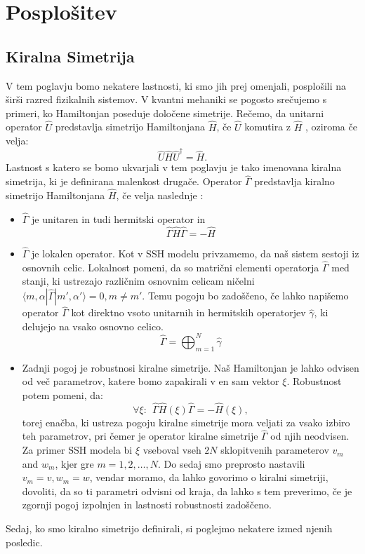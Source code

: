 \section{Posplošitev}
\subsection{Kiralna Simetrija}
V tem poglavju bomo nekatere lastnosti, ki smo jih prej omenjali, posplošili na širši razred fizikalnih sistemov.
V kvantni mehaniki se pogosto srečujemo s primeri, ko Hamiltonjan poseduje določene simetrije. Rečemo, da unitarni operator $\hat{U}$ predstavlja simetrijo Hamiltonjana $\hat{H}$, če $\hat{U}$ komutira z $\hat{H}$ \cite{symmetry}, oziroma če velja:
\begin{equation}
\hat{U} \hat{H} \hat{U}^\dagger = \hat{H}.
\end{equation}
Lastnost s katero se bomo ukvarjali v tem poglavju je tako imenovana kiralna simetrija, ki je definirana malenkost drugače. Operator $\hat{\Gamma}$ predstavlja kiralno simetrijo Hamiltonjana $\hat{H}$, če velja naslednje \cite{madzar}:
\begin{itemize}
 \item $\hat{\Gamma}$ je unitaren in tudi hermitski operator in
\begin{equation}
\hat{\Gamma} \hat{H} \hat{\Gamma} = - \hat{H}
\end{equation}
\item $\hat{\Gamma}$ je lokalen operator. Kot v SSH modelu privzamemo, da naš sistem sestoji iz osnovnih celic. Lokalnost pomeni, da so matrični elementi operatorja $\hat{\Gamma}$ med stanji, ki ustrezajo različnim osnovnim celicam ničelni $\langle m, \alpha | \hat{\Gamma} | m' , \alpha' \rangle = 0,  m \neq m'$. Temu pogoju bo zadoščeno, če lahko napišemo operator $\hat{\Gamma}$ kot direktno vsoto unitarnih in hermitskih operatorjev $\hat{\gamma}$, ki delujejo na vsako osnovno celico.
\begin{equation}
\hat{\Gamma} = \bigoplus_{m=1}^N \hat{\gamma}
\end{equation}
\item Zadnji pogoj je robustnosi kiralne simetrije. Naš Hamiltonjan je lahko odvisen od več parametrov, katere bomo zapakirali v en sam vektor $\xi$. Robustnost potem pomeni, da:
\begin{equation}
\forall \xi:\ \    \hat{\Gamma} \hat{H}(\xi) \hat{\Gamma} = - \hat{H}(\xi),
\end{equation}
torej enačba, ki ustreza pogoju kiralne simetrije mora veljati za vsako izbiro teh parametrov, pri čemer je operator kiralne simetrije $\hat{\Gamma}$ od njih neodvisen. Za primer SSH modela bi $\xi$ vseboval vseh $2N$ sklopitvenih parameterov $v_m$ and $w_m$, kjer gre $m=1,2, \dots ,N$. Do sedaj smo preprosto nastavili $v_m = v, w_m = w$, vendar moramo, da lahko govorimo o kiralni simetriji, dovoliti, da so ti parametri odvisni od kraja, da lahko s tem preverimo, če je zgornji pogoj izpolnjen in lastnosti robustnosti zadoščeno.
\end{itemize}
Sedaj, ko smo kiralno simetrijo definirali, si poglejmo nekatere izmed njenih posledic.
